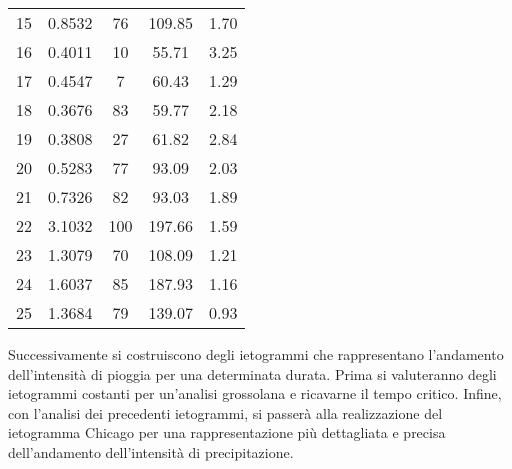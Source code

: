 \begin{table}[htb]
\begin{tabular}{cS[table-format=1.4]S[table-format=3.0]S[table-format=3.2]S[table-format=1.2]}
15       & 0.8532      & 76                & 109.85              & 1.70           \\
16       & 0.4011      & 10                & 55.71               & 3.25           \\
17       & 0.4547      & 7                 & 60.43               & 1.29           \\
18       & 0.3676      & 83                & 59.77               & 2.18           \\
19       & 0.3808      & 27                & 61.82               & 2.84           \\
20       & 0.5283      & 77                & 93.09               & 2.03           \\
21       & 0.7326      & 82                & 93.03               & 1.89           \\
22       & 3.1032      & 100               & 197.66              & 1.59           \\
23       & 1.3079      & 70                & 108.09              & 1.21           \\
24       & 1.6037      & 85                & 187.93              & 1.16           \\
25       & 1.3684      & 79                & 139.07              & 0.93           \\ \bottomrule
\end{tabular}
\end{table}

Successivamente si costruiscono degli ietogrammi che rappresentano l'andamento dell'intensità di pioggia per una determinata durata. 
Prima si valuteranno degli ietogrammi costanti per un'analisi grossolana e  ricavarne il tempo critico.
Infine, con l'analisi dei precedenti ietogrammi, si passerà alla realizzazione del ietogramma Chicago per una rappresentazione più dettagliata e precisa dell'andamento dell'intensità di precipitazione.


